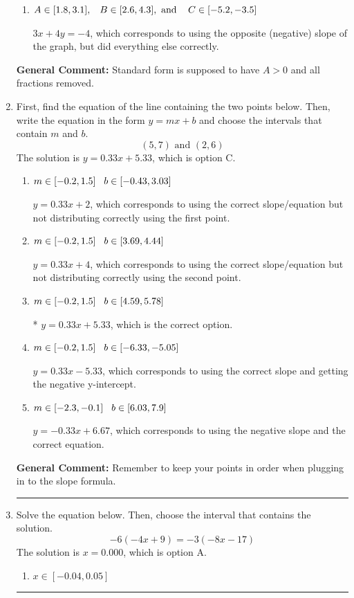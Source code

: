 \documentclass{extbook}[14pt]
\newcommand{\litem}[1]{\item #1

\rule{\textwidth}{0.4pt}}
\begin{document}
\begin{enumerate}
{\begin{enumerate}[label=\Alph*.]
* $3x - 4y = 4$, which is the correct option.
\item \( A \in [1.8, 3.1], \hspace{3mm} B \in [2.6, 4.3], \text{ and } \hspace{3mm} C \in [-5.2, -3.5] \)

 $3x + 4y = -4$, which corresponds to using the opposite (negative) slope of the graph, but did everything else correctly.
\end{enumerate}

\textbf{General Comment:} Standard form is supposed to have $A > 0$ and all fractions removed.
}
\litem{
First, find the equation of the line containing the two points below. Then, write the equation in the form $ y=mx+b $ and choose the intervals that contain $m$ and $b$.
\[ (5, 7) \text{ and } (2, 6) \]The solution is \( y = 0.33x + 5.33 \), which is option C.\begin{enumerate}[label=\Alph*.]
\item \( m \in [-0.2, 1.5] \hspace*{3mm} b \in [-0.43, 3.03] \)

 $y = 0.33x + 2$, which corresponds to using the correct slope/equation but not distributing correctly using the first point.
\item \( m \in [-0.2, 1.5] \hspace*{3mm} b \in [3.69, 4.44] \)

 $y = 0.33x + 4$, which corresponds to using the correct slope/equation but not distributing correctly using the second point.
\item \( m \in [-0.2, 1.5] \hspace*{3mm} b \in [4.59, 5.78] \)

* $y = 0.33x + 5.33$, which is the correct option.
\item \( m \in [-0.2, 1.5] \hspace*{3mm} b \in [-6.33, -5.05] \)

 $y = 0.33x -5.33$, which corresponds to using the correct slope and getting the negative y-intercept.
\item \( m \in [-2.3, -0.1] \hspace*{3mm} b \in [6.03, 7.9] \)

 $y = -0.33x + 6.67$, which corresponds to using the negative slope and the correct equation.
\end{enumerate}

\textbf{General Comment:} Remember to keep your points in order when plugging in to the slope formula.
}
\litem{
Solve the equation below. Then, choose the interval that contains the solution.
\[ -6(-4x + 9) = -3(-8x -17) \]The solution is \( x = 0.000 \), which is option A.\begin{enumerate}[label=\Alph*.]
\item \( x \in [-0.04, 0.05] \)


\end{enumerate}}
\end{enumerate}
\end{document}
